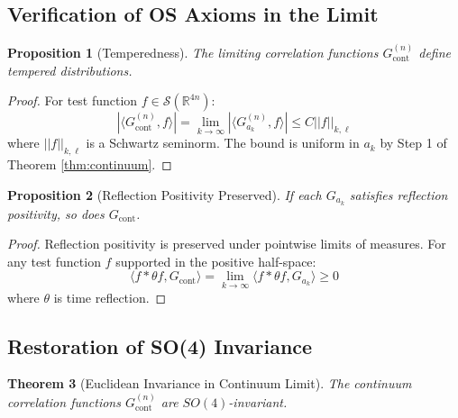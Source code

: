 \documentclass[11pt]{article}
\numberwithin{equation}{section}
\newtheorem{theorem}{Theorem}[section]
\newtheorem{proposition}[theorem]{Proposition}
\theoremstyle{definition}
\theoremstyle{remark}
\begin{document}
\subsection{Verification of OS Axioms in the Limit}

\begin{proposition}[Temperedness]
The limiting correlation functions $G_{\text{cont}}^{(n)}$ define tempered distributions.
\end{proposition}

\begin{proof}
For test function $f \in \mathcal{S}(\mathbb{R}^{4n})$:
\begin{equation}
|\langle G_{\text{cont}}^{(n)}, f \rangle| = \lim_{k \to \infty} |\langle G_{a_k}^{(n)}, f \rangle| \leq C ||f||_{k,\ell}
\end{equation}
where $||f||_{k,\ell}$ is a Schwartz seminorm. The bound is uniform in $a_k$ by Step 1 of Theorem \ref{thm:continuum}.
\end{proof}

\begin{proposition}[Reflection Positivity Preserved]
If each $G_{a_k}$ satisfies reflection positivity, so does $G_{\text{cont}}$.
\end{proposition}

\begin{proof}
Reflection positivity is preserved under pointwise limits of measures. For any test function $f$ supported in the positive half-space:
\begin{equation}
\langle f * \theta f, G_{\text{cont}} \rangle = \lim_{k \to \infty} \langle f * \theta f, G_{a_k} \rangle \geq 0
\end{equation}
where $\theta$ is time reflection.
\end{proof}

\subsection{Restoration of SO(4) Invariance}

\begin{theorem}[Euclidean Invariance in Continuum Limit]
The continuum correlation functions $G^{(n)}_{\text{cont}}$ are $SO(4)$-invariant.
\end{theorem}
\end{document}
